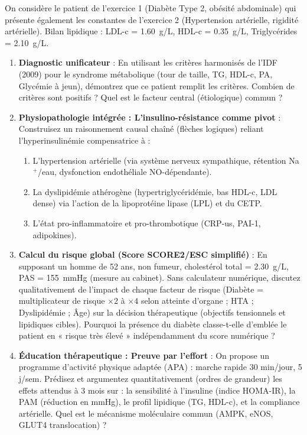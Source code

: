 \documentclass[11pt]{article}
\begin{document}
\begin{exercice}
On considère le patient de l'exercice 1 (Diabète Type 2, obésité abdominale) qui présente également les constantes de l'exercice 2 (Hypertension artérielle, rigidité artérielle). Bilan lipidique : LDL-c = \SI{1.60}{g/L}, HDL-c = \SI{0.35}{g/L}, Triglycérides = \SI{2.10}{g/L}.

\begin{enumerate}
    \item \textbf{Diagnostic unificateur} : En utilisant les critères harmonisés de l'IDF (2009) pour le syndrome métabolique (tour de taille, TG, HDL-c, PA, Glycémie à jeun), démontrez que ce patient remplit les critères. Combien de critères sont positifs ? Quel est le facteur central (étiologique) commun ?
    \item \textbf{Physiopathologie intégrée : L'insulino-résistance comme pivot} : Construisez un raisonnement causal chaîné (flèches logiques) reliant l'hyperinsulinémie compensatrice à :
    \begin{enumerate}
        \item L'hypertension artérielle (via système nerveux sympathique, rétention Na$^+$/eau, dysfonction endothéliale NO-dépendante).
        \item La dyslipidémie athérogène (hypertriglycéridémie, bas HDL-c, LDL dense) via l'action de la lipoprotéine lipase (LPL) et du CETP.
        \item L'état pro-inflammatoire et pro-thrombotique (CRP-us, PAI-1, adipokines).
    \end{enumerate}
    \item \textbf{Calcul du risque global (Score SCORE2/ESC simplifié)} : En supposant un homme de 52 ans, non fumeur, cholestérol total = \SI{2.30}{g/L}, PAS = \SI{155}{mmHg} (mesure au cabinet). Sans calculateur numérique, discutez qualitativement de l'impact de chaque facteur de risque (Diabète = multiplicateur de risque $\times 2$ à $\times 4$ selon atteinte d'organe ; HTA ; Dyslipidémie ; Âge) sur la décision thérapeutique (objectifs tensionnels et lipidiques cibles). Pourquoi la présence du diabète classe-t-elle d'emblée le patient en « risque très élevé » indépendamment du score numérique ?
    \item \textbf{Éducation thérapeutique : Preuve par l'effort} : On propose un programme d'activité physique adaptée (APA) : marche rapide 30 min/jour, 5 j/sem. Prédisez et argumentez quantitativement (ordres de grandeur) les effets attendus à 3 mois sur : la sensibilité à l'insuline (indice HOMA-IR), la PAM (réduction en mmHg), le profil lipidique (TG, HDL-c), et la compliance artérielle. Quel est le mécanisme moléculaire commun (AMPK, eNOS, GLUT4 translocation) ?
\end{enumerate}
\end{exercice}
\end{document}
